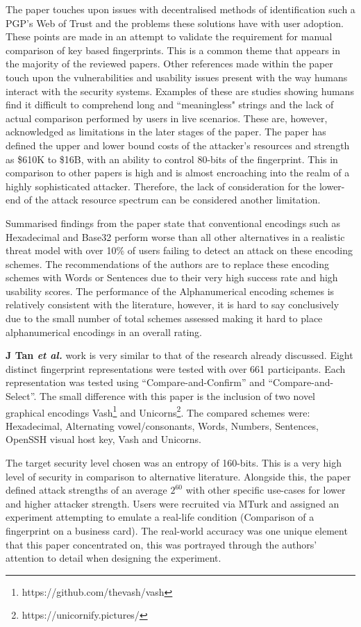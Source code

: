 The paper touches upon issues with decentralised methods of identification such a PGP's Web of Trust and the problems these solutions have with user adoption. These points are made in an attempt to validate the requirement for manual comparison of key based fingerprints. This is a common theme that appears in the majority of the reviewed papers. Other references made within the paper touch upon the vulnerabilities and usability issues present with the way humans interact with the security systems. Examples of these are studies showing humans find it difficult to comprehend long and ``meaningless" strings and the lack of actual comparison performed by users in live scenarios. These are, however, acknowledged as limitations in the later stages of the paper. The paper has defined the upper and lower bound costs of the attacker's resources and strength as \$610K to \$16B, with an ability to control 80-bits of the fingerprint. This in comparison to other papers is high and is almost encroaching into the realm of a highly sophisticated attacker. Therefore, the lack of consideration for the lower-end of the attack resource spectrum can be considered another limitation.

Summarised findings from the paper state that conventional encodings such as Hexadecimal and Base32 perform worse than all other alternatives in a realistic threat model with over 10\% of users failing to detect an attack on these encoding schemes. The recommendations of the authors are to replace these encoding schemes with Words or Sentences due to their very high success rate and high usability scores. The performance of the Alphanumerical encoding schemes is relatively consistent with the literature, however, it is hard to say conclusively due to the small number of total schemes assessed making it hard to place alphanumerical encodings in an overall rating.

\textbf{J Tan \textit{et al.}}\cite{tan2017can} work is very similar to that of the research already discussed. Eight distinct fingerprint representations were tested with over 661 participants. Each representation was tested using ``Compare-and-Confirm'' and ``Compare-and-Select''. The small difference with this paper is the inclusion of two novel graphical encodings Vash\footnote{https://github.com/thevash/vash} and Unicorns\footnote{https://unicornify.pictures/}. The compared schemes were: Hexadecimal, Alternating vowel/consonants, Words, Numbers, Sentences, OpenSSH visual host key, Vash and Unicorns.

The target security level chosen was an entropy of 160-bits. This is a very high level of security in comparison to alternative literature. Alongside this, the paper defined attack strengths of an average $2^{60}$ with other specific use-cases for lower and higher attacker strength. Users were recruited via MTurk and assigned an experiment attempting to emulate a real-life condition (Comparison of a fingerprint on a business card). The real-world accuracy was one unique element that this paper concentrated on, this was portrayed through the authors' attention to detail when designing the experiment.


